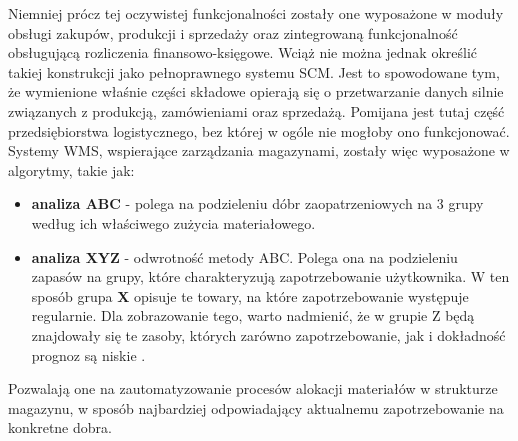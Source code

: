 		Niemniej prócz tej oczywistej funkcjonalności zostały one wyposażone w moduły obsługi zakupów, produkcji i sprzedaży oraz zintegrowaną
		funkcjonalność obsługującą rozliczenia finansowo-księgowe. Wciąż nie można jednak określić takiej
		konstrukcji jako pełnoprawnego systemu SCM. Jest to spowodowane tym, że wymienione właśnie części składowe
		opierają się o przetwarzanie danych silnie związanych z produkcją, zamówieniami oraz sprzedażą. Pomijana 
		jest tutaj część przedsiębiorstwa logistycznego, bez której w ogóle nie mogłoby ono funkcjonować.
		Systemy WMS, wspierające zarządzania magazynami, zostały więc wyposażone w algorytmy, takie jak:
		\begin{itemize}
			\item \textbf{analiza ABC} - polega na podzieleniu dóbr zaopatrzeniowych na 3 grupy według ich właściwego zużycia materiałowego.
			\item \textbf{analiza XYZ} - odwrotność metody ABC. Polega ona na podzieleniu zapasów na grupy, które charakteryzują
			zapotrzebowanie użytkownika. W ten sposób grupa \textbf{X} opisuje te towary, na które zapotrzebowanie występuje regularnie.
			Dla zobrazowanie tego, warto nadmienić, że w grupie Z będą znajdowały się te zasoby, których zarówno zapotrzebowanie, 
			jak i dokładność prognoz są niskie .
		\end{itemize}
		Pozwalają one na zautomatyzowanie procesów alokacji materiałów w strukturze magazynu, w sposób najbardziej odpowiadający
		aktualnemu zapotrzebowanie na konkretne dobra.
		
